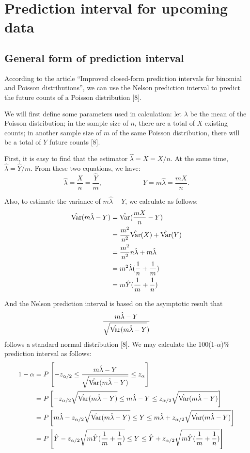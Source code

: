 \documentclass[a4paper]{article}
\begin{document}
\section{Prediction interval for upcoming data}
\subsection{General form of prediction interval}
	According to the article “Improved closed-form prediction intervals for binomial and Poisson distributions”, we can use the Nelson prediction interval to predict the future counts of a Poisson distribution [8].
	
	We will first define some parameters used in calculation: let $\lambda$ be the mean of the Poisson distribution; in the sample size of $n$, there are a total of $X$ existing counts; in another sample size of $m$ of the same Poisson distribution, there will be a total of $Y$ future counts [8].
	
	First, it is easy to find that the estimator $\hat{\lambda}=\bar{X}=X/n$. At the same time, $\hat{\lambda}=\hat{Y}/m$. From these two equations, we have: $$\hat{\lambda}=\frac{X}{n}=\frac{\hat{Y}}{m},\qquad\qquad\qquad\hat{Y}=m\hat{\lambda}=\frac{mX}{n}.$$

Also, to estimate the variance of $m\hat{\lambda}-Y$, we calculate as follows:
\begin{align*}
\hat{\rm Var}(m\hat{\lambda}-Y)&=\hat{\rm Var}(\frac{mX}{n}-Y)\\
&=\frac{m^2}{n^2}\hat{\rm Var}(X)+\hat{\rm Var}(Y)\\
&=\frac{m^2}{n^2}n\hat{\lambda}+m\hat{\lambda}\\
&=m^2\hat{\lambda}(\frac{1}{n}+\frac{1}{m})\\
&=m\hat{Y}(\frac{1}{m}+\frac{1}{n})
\end{align*}

	And the Nelson prediction interval is based on the asymptotic result that $$\frac{m\hat{\lambda}-Y}{\sqrt{\hat{\rm Var}(m\hat{\lambda}-Y})}$$ follows a standard normal distribution [8]. We may calculate the 100(1-$\alpha$)\% prediction interval as follows:
\begin{align*}
1-\alpha&=P\left[-z_{\alpha/2}\le\frac{m\hat{\lambda}-Y}{\sqrt{\hat{\rm Var}(m\hat{\lambda}-Y)}}\le z_{\alpha}\right] \\
&=P\left[-z_{\alpha/2}\sqrt{\hat{\rm Var}(m\hat{\lambda}-Y)}\le m\hat{\lambda}-Y\le z_{\alpha/2}\sqrt{\hat{\rm Var}(m\hat{\lambda}-Y)}\right]\\
&=P\left[m\hat{\lambda}-z_{\alpha/2}\sqrt{\hat{\rm Var}(m\hat{\lambda}-Y)}\le Y\le m\hat{\lambda}+z_{\alpha/2}\sqrt{\hat{\rm Var}(m\hat{\lambda}-Y)}\right]\\
&=P\left[\hat{Y}-z_{\alpha/2}\sqrt{m\hat{Y}(\frac{1}{m}+\frac{1}{n})}\le Y\le \hat{Y}+z_{\alpha/2}\sqrt{m\hat{Y}(\frac{1}{m}+\frac{1}{n})}\right]
\end{align*}
\end{document}
